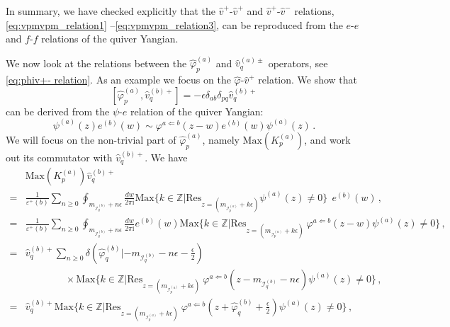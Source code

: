 \documentclass[12pt,a4paper]{article}
\newcounter{subsubsubsection}[subsubsection]
\renewcommand{\(}{\left(}
\renewcommand{\)}{\right)}
\renewcommand{\(}{\left(}
\renewcommand{\)}{\right)}
\begin{document}
\medskip

In summary, we have checked explicitly that the $\hat{v}^{+}$-$\hat{v}^{+}$  and $\hat{v}^{+}$-$\hat{v}^{-}$ relations, \eqref{eq:vpmvpm_relation1} --\eqref{eq:vpmvpm_relation3}, can be reproduced from the $e$-$e$ and $f$-$f$ relations of the quiver Yangian. 




We now look at the relations between the $\hat{\varphi}^{(a)}_p$ and $\hat{v}^{(a)\pm}_{q}$ operators, see \eqref{eq:phiv+- relation}.
As an example we focus on the $\hat{\varphi}$-$\hat{v}^+$ relation.
We show that
\begin{equation}\label{eq:phiv+ relation}
[\hat{\varphi}^{(a)}_p, \hat{v}^{(b)+}_q]=-\epsilon\delta_{ab}\delta_{pq}\hat{v}^{(b)+}_q
\end{equation}
can be derived from the $\psi$-$e$ relation
of the quiver Yangian:
\begin{equation}\label{eq:QY_psi_e}
\psi^{(a)}(z)e^{(b)}(w)\sim \varphi^{a\Leftarrow b}(z-w)e^{(b)}(w)\psi^{(a)}(z)\,.
\end{equation}
We will focus on the non-trivial part of $\hat{\varphi}^{(a)}_p$, namely $\text{Max}( K^{(a)}_{p})$, and work out its commutator with $\hat{v}^{(b)+}_q$. We have
\begin{equation}
\begin{aligned}
&\text{Max}( K^{(a)}_{p}) \hat{v}^{(b)+}_q \\
=&\frac{1}{\varepsilon^+(b)}\sum_{n\geq 0}\oint_{m_{\mathcal{I}^{(b)}_{q}}+n\epsilon}\frac{dw}{2\pi \text{i}}
\text{Max}\{ k\in \mathbb{Z}|\text{Res}_{z=(m_{\mathcal{I}^{(a)}_{p}}+k\epsilon)}\psi^{(a)}(z)\neq 0\}\ \ e^{(b)}(w)\,,\\
=&\frac{1}{\varepsilon^+(b)}\sum_{n\geq 0}\oint_{m_{\mathcal{I}^{(b)}_{q}}+n\epsilon}\frac{dw}{2\pi \text{i}}e^{(b)}(w) \text{Max}\{ k\in \mathbb{Z}|\text{Res}_{z=(m_{\mathcal{I}^{(a)}_{p}}+k\epsilon)}\ \varphi^{a\Leftarrow b}(z-w)\psi^{(a)}(z)\neq 0\}\,,\\
=&\hat{v}^{(b)+}_q\sum_{n\geq 0} \delta(\hat{\varphi}^{(b)}_{q}|-m_{\mathcal{I}^{(b)}_{q}}-n\epsilon-\frac{\epsilon}{2})\\
&\qquad \qquad \times\text{Max}\{ k\in \mathbb{Z}|\text{Res}_{z=(m_{\mathcal{I}^{(a)}_{p}}+k\epsilon)}\ \varphi^{a\Leftarrow b}(z-m_{\mathcal{I}^{(b)}_{q}}-n\epsilon)\psi^{(a)}(z)\neq 0\}\,,\\
=&\hat{v}^{(b)+}_q \text{Max}\{ k\in \mathbb{Z}|\text{Res}_{z=(m_{\mathcal{I}^{(a)}_{p}}+k\epsilon)}\ \varphi^{a\Leftarrow b}(z+\hat{\varphi}^{(b)}_{q}+\frac{\epsilon}{2})\psi^{(a)}(z)\neq 0\}\,,
\end{aligned}
\end{equation}
\end{document}
